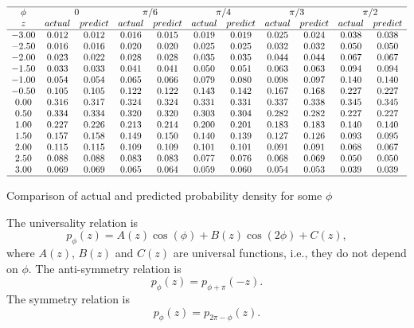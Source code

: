 \documentclass[twoside]{article}
\begin{document}
\begin{table}
\centering \(\begin{array}{ccccccccccc}

\hline
\phi  &  \multicolumn{2}{c}  {0 }   &    \multicolumn{2}{c}  {\pi/6}&  \multicolumn{2}{c}  { \pi/4}   &    \multicolumn{2}{c}  {\pi/3}&  \multicolumn{2}{c}  {\pi/2 } \\
z&actual&predict&actual&predict &actual&predict &actual&predict &actual&predict\\
\hline
  -3.00&  0.012&  0.012&  0.016&  0.015&  0.019&  0.019&  0.025&  0.024&  0.038&  0.038 \\
  -2.50&  0.016&  0.016&  0.020&  0.020&  0.025&  0.025&  0.032&  0.032&  0.050&  0.050 \\
  -2.00&  0.023&  0.022&  0.028&  0.028&  0.035&  0.035&  0.044&  0.044&  0.067&  0.067 \\
  -1.50&  0.033&  0.033&  0.041&  0.041&  0.050&  0.051&  0.063&  0.063&  0.094&  0.094 \\
  -1.00&  0.054&  0.054&  0.065&  0.066&  0.079&  0.080&  0.098&  0.097&  0.140&  0.140 \\
  -0.50&  0.105&  0.105&  0.122&  0.122&  0.143&  0.142&  0.167&  0.168&  0.227&  0.227 \\
   0.00&  0.316&  0.317&  0.324&  0.324&  0.331&  0.331&  0.337&  0.338&  0.345&  0.345 \\
   0.50&  0.334&  0.334&  0.320&  0.320&  0.303&  0.304&  0.282&  0.282&  0.227&  0.227 \\
   1.00&  0.227&  0.226&  0.213&  0.214&  0.200&  0.201&  0.183&  0.183&  0.140&  0.140 \\
   1.50&  0.157&  0.158&  0.149&  0.150&  0.140&  0.139&  0.127&  0.126&  0.093&  0.095 \\
   2.00&  0.115&  0.115&  0.109&  0.109&  0.101&  0.101&  0.091&  0.091&  0.068&  0.067 \\
   2.50&  0.088&  0.088&  0.083&  0.083&  0.077&  0.076&  0.068&  0.069&  0.050&  0.050 \\
   3.00&  0.069&  0.069&  0.065&  0.064&  0.059&  0.060&  0.054&  0.053&  0.039&  0.039 \\
\hline
\end{array}\)
\caption{Comparison of actual and predicted probability density for some $\phi$   }
\label{tab:pred}
\end{table}



The universality relation is
\begin{equation}
p_{\phi}(z) = A(z)\cos(\phi) + B(z)\cos(2\phi) +C(z),
\label{eq:universality}
\end{equation}
where $A(z)$, $B(z)$ and $C(z)$ are universal functions, i.e., they do not depend on $\phi$. 
The anti-symmetry relation is
\begin{equation}
p_{\phi}(z) = p_{\phi+\pi}(-z).
\label{eq:rhoantisym}
\end{equation}
The symmetry relation is
\begin{equation}
p_{\phi}(z) = p_{2\pi-\phi}(z).
\label{eq:rhosym}
\end{equation}
\end{document}
